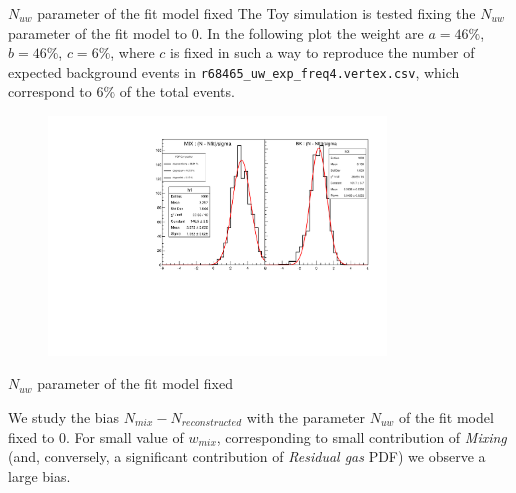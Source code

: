 \documentclass[9pt]{beamer}
\newcommand{\nologo}{\setbeamertemplate{logo}{}}
\begin{document}
{
\begin{frame}{$N_{uw}$ parameter of the fit model fixed}
The Toy simulation is tested fixing the $N_{uw}$ parameter of the fit model to $0$. In the following plot the weight are $a = 46\%$, $b = 46\%$, $c = 6\%$, where $c$ is fixed in such a way to reproduce the number of expected background events in \texttt{r68465\_uw\_exp\_freq4.vertex.csv}, which correspond to $6\%$ of the total events.
\begin{figure}
\includegraphics[width = 0.8\textwidth]{N165/ToyNmixNbk,NuwFixed(46,46,6).pdf}
\end{figure}
\end{frame}
}

{\nologo
\begin{frame}{$N_{uw}$ parameter of the fit model fixed}

We study the bias $N_{mix} - N_{reconstructed}$ with the parameter $N_{uw}$ of the fit model fixed to $0$. For small value of $w_{mix}$, corresponding to small contribution of \textit{Mixing}  (and, conversely, a significant contribution of \textit{Residual gas} PDF) we observe a large bias.

\begin{figure}
\end{figure}
\end{frame}
}
\end{document}
